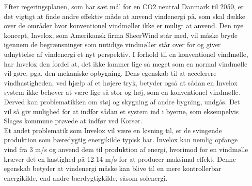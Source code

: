 Efter regeringsplanen, som har sæt mål for en CO2 neutral Danmark til 2050, er det vigtigt at finde andre effektiv måde at anvend vindenergi på, som skal dække over de områder hvor konventionel vindmøller ikke er muligt at anvend. Den nye koncept, Invelox, som Amerikansk firma SheerWind står med, vil måske bryde igennem de begrænsninger som nutidige vindmøller står over for og giver udnyttelse af vindenergi et nyt perspektiv. I forhold til en konventionel vindmølle, har Invelox den fordel at, det ikke lammer lige så meget som en normal vindmølle vil gøre, pga. den mekaniske opbygning. Dens egenskab til at accelerere vindhastigheden, ved hjælp af et højere tryk, betyder også at sådan en Invelox system ikke behøver at være lige så stor og høj, som en konventionel vindmølle. Derved kan problematikken om støj og skygning af andre bygning, undgås. Det vil så giv mulighed for at indfør sådan et system ind i byerne, som eksempelvis Slages kommune prøvede at indfør ved Korsør. \\
Et andet problematik som Invelox vil være en løsning til, er de svingende produktion som bæredygtig energikilde typisk har. Invelox kan nemlig opfange vind fra 3 m/s og anvend dem til produktion af energi, hvorimod for en vindmølle kræver det en hastighed på 12-14 m/s for at producer maksimal effekt. Denne egenskab betyder at vindenergi måske kan blive til en mere kontrollerbar energikilde, end andre bærdygtigkilde, såsom solenergi.     
